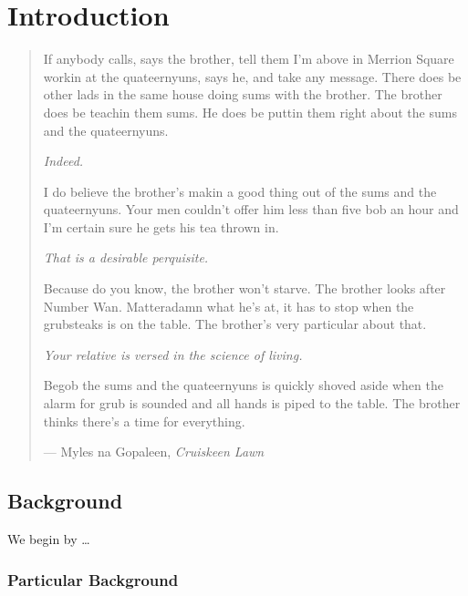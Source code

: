 %
%
%
%

\chapter{Introduction}\label{C.intro}

\begin{quote}
If anybody calls, says the brother, tell them I'm above in Merrion Square workin at the 
quateernyuns, says he, and take any message.  There does be other lads in the same house 
doing sums with the brother.  The brother does be teachin them sums.  He does be puttin 
them right about the sums and the quateernyuns.

\textit{Indeed.} 

I do believe the brother's makin a good thing out of the sums and the quateernyuns.  Your 
men couldn't offer him less than five bob an hour and I'm certain sure he gets his tea 
thrown in.

\textit{That is a desirable perquisite.} 

Because do you know, the brother won't starve.  The brother looks after Number Wan. 
Matteradamn what he's at, it has to stop when the grubsteaks is on the table.  The brother's 
very particular about that.

\textit{Your relative is versed in the science of living.} 

Begob the sums and the quateernyuns is quickly shoved aside when the alarm for grub is sounded 
and all hands is piped to the table.  The brother thinks there's a time for everything.

\hspace{2cm}--- Myles na Gopaleen, \emph{Cruiskeen Lawn}
\end{quote}


\section{Background}\label{S.intro1}

We begin by \ldots

\subsection{Particular Background}\label{SS.xyz}

